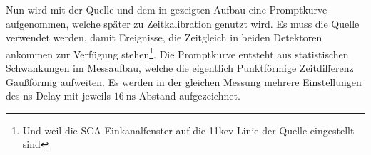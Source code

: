Nun wird mit der \na Quelle und dem in  gezeigten Aufbau eine Promptkurve aufgenommen, welche später zu Zeitkalibration genutzt wird. Es muss die \na Quelle verwendet werden, damit Ereignisse, die Zeitgleich in beiden Detektoren ankommen zur Verfügung stehen\footnote{Und weil die SCA-Einkanalfenster auf die \511kev Linie der \na Quelle eingestellt sind}. Die Promptkurve entsteht aus statistischen Schwankungen im Messaufbau, welche die eigentlich Punktförmige Zeitdifferenz Gaußförmig aufweiten. Es werden in der gleichen Messung mehrere Einstellungen des ns-Delay mit jeweils $\SI{16}{\nano\second}$ Abstand aufgezeichnet.

